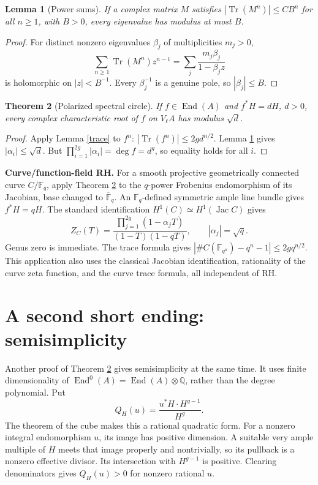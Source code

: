 \documentclass[11pt]{article}
\newtheorem{theorem}{Theorem}
\newtheorem{lemma}[theorem]{Lemma}
\newcommand{\End}{\operatorname{End}}
\newcommand{\Tr}{\operatorname{Tr}}
\newcommand{\Q}{\mathbb Q}
\begin{document}
\begin{lemma}[Power sums]\label{powers}
If a complex matrix \(M\) satisfies
\(\left|\Tr(M^n)\right|\le C B^n\) for all \(n\ge1\), with \(B>0\),
every eigenvalue has modulus at most \(B\).
\end{lemma}
\begin{proof}
For distinct nonzero eigenvalues \(\beta_j\) of multiplicities \(m_j>0\),
\[
 \sum_{n\ge1}\Tr(M^n)z^{n-1}
   =\sum_j\frac{m_j\beta_j}{1-\beta_jz}
\]
is holomorphic on \(|z|<B^{-1}\). Every \(\beta_j^{-1}\) is a genuine
pole, so \(|\beta_j|\le B\).
\end{proof}

\begin{theorem}[Polarized spectral circle]\label{circle}
If \(f\in\End(A)\) and \(f^*H=dH\), \(d>0\), every complex characteristic root of \(f\)
on \(V_\ell A\) has modulus \(\sqrt d\).
\end{theorem}
\begin{proof}
Apply Lemma \ref{trace} to \(f^n\):
\(\left|\Tr(f^n)\right|\le2g d^{n/2}\).
Lemma \ref{powers} gives \(|\alpha_i|\le\sqrt d\).
But \(\prod_{i=1}^{2g}|\alpha_i|=\deg f=d^g\), so equality holds for all \(i\).
\end{proof}

\noindent
\textbf{Curve/function-field RH.}
For a smooth projective geometrically connected curve \(C/\mathbb F_q\),
apply Theorem \ref{circle} to the \(q\)-power Frobenius endomorphism of its
Jacobian, base changed to \(\overline{\mathbb F}_q\). An
\(\mathbb F_q\)-defined symmetric ample line bundle gives \(f^*H=qH\).
The standard identification
\(H^1(C)\simeq H^1(\operatorname{Jac}C)\) gives
\[
 Z_C(T)=\frac{\prod_{j=1}^{2g}(1-\alpha_jT)}{(1-T)(1-qT)},
 \qquad |\alpha_j|=\sqrt q.
\]
Genus zero is immediate. The trace formula gives
\(\left|\#C(\mathbb F_{q^n})-q^n-1\right|\le2g q^{n/2}\).
This application also uses the classical Jacobian identification, rationality
of the curve zeta function, and the curve trace formula, all independent of RH.

\section*{A second short ending: semisimplicity}
Another proof of Theorem \ref{circle} gives semisimplicity at the same time.
It uses finite dimensionality of \(\End^0(A)=\End(A)\otimes\Q\),
rather than the degree polynomial. Put
\[
 Q_H(u)=\frac{u^*H\cdot H^{g-1}}{H^g}.
 \tag{3}
\]
The theorem of the cube makes this a rational quadratic form.
For a nonzero integral endomorphism \(u\), its image has positive dimension.
A suitable very ample multiple of \(H\) meets that image properly and
nontrivially, so its pullback is a nonzero effective divisor.
Its intersection with \(H^{g-1}\) is positive.
Clearing denominators gives \(Q_H(u)>0\) for nonzero rational \(u\).
\end{document}
